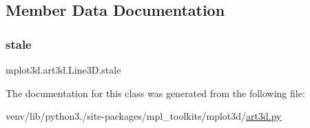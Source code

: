 \subsection{Member Data Documentation}
\mbox{\label{classmplot3d_1_1art3d_1_1Line3D_aef7747f46acbc890c6a2336bc406fd26}} 
\subsubsection{\texorpdfstring{stale}{stale}}
{\footnotesize\ttfamily mplot3d.\+art3d.\+Line3\+D.\+stale}



The documentation for this class was generated from the following file\+:\begin{DoxyCompactItemize}
\item 
venv/lib/python3./site-\/packages/mpl\+\_\+toolkits/mplot3d/\hyperlink{art3d_8py}{art3d.\+py}\end{DoxyCompactItemize}
